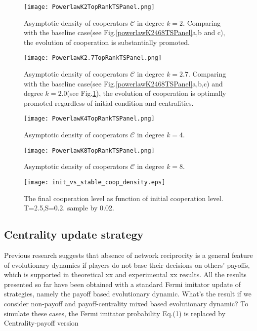 \documentclass[preprint,12pt,3p]{elsarticle}
\begin{document}
\begin{figure}[htbp]
\centering
\texttt{[image: PowerlawK2TopRankTSPanel.png]}

\caption{Asymptotic density of cooperators $\mathcal{C}$ in degree $k=2$.
Comparing with the baseline case(see Fig.\ref{powerlawK2468TSPanel}a,b and c),
the evolution of cooperation is substantially promoted.
}
\label{PowerlawK2TopRankTSPanel}
\end{figure}


\begin{figure}[htbp]
\centering
\texttt{[image: PowerlawK2.7TopRankTSPanel.png]}

\caption{Asymptotic density of cooperators $\mathcal{C}$ in degree $k=2.7$.
Comparing with the baseline case(see Fig.\ref{powerlawK2468TSPanel}a,b,c) and
degree $k=2.0$(see Fig.\ref{PowerlawK2TopRankTSPanel}),
the evolution of cooperation is optimally promoted regardless of initial condition and centralities.}
\label{PowerlawK2.7TopRankTSPanel}
\end{figure}


\begin{figure}[htbp]
\centering
\texttt{[image: PowerlawK4TopRankTSPanel.png]}

\caption{Asymptotic density of cooperators $\mathcal{C}$ in degree $k=4$.}
\label{PowerlawK4TopRankTSPanel}
\end{figure}


\begin{figure}[htbp]
\centering
\texttt{[image: PowerlawK8TopRankTSPanel.png]}

\caption{Asymptotic density of cooperators $\mathcal{C}$ in degree $k=8$.}
\label{PowerlawK8TopRankTSPanel}
\end{figure}

\begin{figure}[htbp]
\centering
\texttt{[image: init\_vs\_stable\_coop\_density.eps]}

\caption{The final cooperation level as function of initial cooperation level.
T=2.5,S=0.2. sample by 0.02. }
\label{InitVsFinalCoopLevel}
\end{figure}



\subsection{Centrality update strategy} %

Previous research suggests that absence of network reciprocity is a general feature of
evolutionary dynamics if players do not base their decisions on others’ payoffs,
which is supported  in theoretical xx and experimental xx results.
All the results presented so far have been obtained with a standard Fermi imitator update of strategies, namely the payoff based evolutionary dynamic.
What's the result if we consider non-payoff and payoff-centrality mixed based evolutionary dynamic?
    To simulate these cases, the Fermi imitator probability Eq.(1) is replaced by Centrality-payoff version
\end{document}
